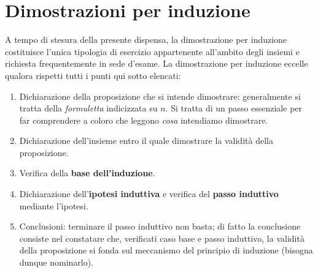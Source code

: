 
\section{Dimostrazioni per induzione}

A tempo di stesura della presente dispensa, la dimostrazione per induzione
costituisce l'unica tipologia di esercizio appartenente all'ambito degli
insiemi e richiesta frequentemente in sede d'esame.
La dimostrazione per induzione eccelle qualora rispetti tutti i punti qui
sotto elencati:
\begin{enumerate}
\item Dichiarazione della proposizione che si intende dimostrare:
generalmente si tratta della \textit{formuletta} indicizzata su $n$.
Si tratta di un passo essenziale per far comprendere a coloro che
leggono \textit{cosa} intendiamo dimostrare.
\item Dichiarazione dell'insieme entro il quale dimostrare la
validità della proposizione.
\item Verifica della \textbf{base dell'induzione}.
\item Dichiarazione dell'\textbf{ipotesi induttiva} e verifica del
\textbf{passo induttivo} mediante l'ipotesi.
\item Conclusioni: terminare il passo induttivo non basta; di fatto
la conclusione consiste nel constatare che, verificati caso base e
passo induttivo, la validità della proposizione si fonda sul meccanismo
del principio di induzione (bisogna dunque nominarlo).
\end{enumerate}

